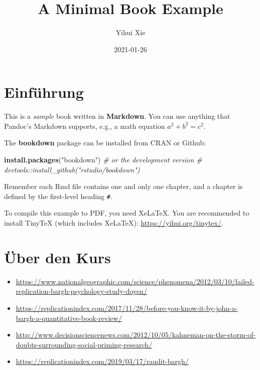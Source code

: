 \documentclass[
]{book}
\title{A Minimal Book Example}
\author{Yihui Xie}
\date{2021-01-26}
\newenvironment{Shaded}{\begin{snugshade}}{\end{snugshade}}
\newcommand{\CommentTok}[1]{\textcolor[rgb]{0.56,0.35,0.01}{\textit{#1}}}
\newcommand{\KeywordTok}[1]{\textcolor[rgb]{0.13,0.29,0.53}{\textbf{#1}}}
\newcommand{\NormalTok}[1]{#1}
\newcommand{\StringTok}[1]{\textcolor[rgb]{0.31,0.60,0.02}{#1}}
\providecommand{\tightlist}{%
  \setlength{\itemsep}{0pt}\setlength{\parskip}{0pt}}
\begin{document}
\maketitle

{
\setcounter{tocdepth}{1}
\tableofcontents
}
\hypertarget{einfuxfchrung}{%
\chapter{Einführung}\label{einfuxfchrung}}

This is a \emph{sample} book written in \textbf{Markdown}. You can use anything that Pandoc's Markdown supports, e.g., a math equation \(a^2 + b^2 = c^2\).

The \textbf{bookdown} package can be installed from CRAN or Github:

\begin{Shaded}
\begin{Highlighting}[]
\KeywordTok{install.packages}\NormalTok{(}\StringTok{"bookdown"}\NormalTok{)}
\CommentTok{# or the development version}
\CommentTok{# devtools::install_github("rstudio/bookdown")}
\end{Highlighting}
\end{Shaded}

Remember each Rmd file contains one and only one chapter, and a chapter is defined by the first-level heading \texttt{\#}.

To compile this example to PDF, you need XeLaTeX. You are recommended to install TinyTeX (which includes XeLaTeX): \url{https://yihui.org/tinytex/}.

\hypertarget{intro}{%
\chapter{Über den Kurs}\label{intro}}

\begin{itemize}
\tightlist
\item
  \url{https://www.nationalgeographic.com/science/phenomena/2012/03/10/failed-replication-bargh-psychology-study-doyen/}
\item
  \url{https://replicationindex.com/2017/11/28/before-you-know-it-by-john-a-bargh-a-quantitative-book-review/}
\item
  \url{http://www.decisionsciencenews.com/2012/10/05/kahneman-on-the-storm-of-doubts-surrounding-social-priming-research/}
\item
  \url{https://replicationindex.com/2019/03/17/raudit-bargh/}
\end{itemize}
\end{document}
